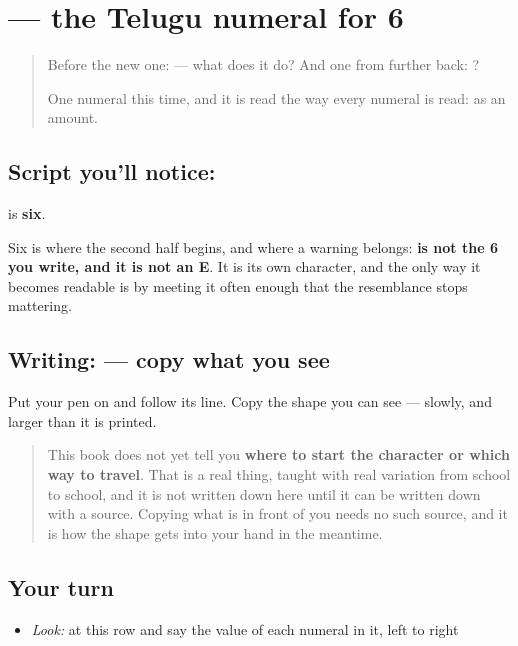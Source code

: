 \section[\texorpdfstring{\te{౬} (6)}{౬ (6)}]{ — the Telugu numeral for 6}

\label{lesson:TE-S145-digit-6}



\begin{quote}
Before the new one:  — what does it do? And one from further back: ?

One numeral this time, and it is read the way every numeral is read: as an amount.
\end{quote}

\subsection*{Script you'll notice: }
\textbf{} is \textbf{six}.

Six is where the second half begins, and where a warning belongs: \textbf{ is not the 6 you write, and it is not an E}. It is its own character, and the only way it becomes readable is by meeting it often enough that the resemblance stops mattering.

\subsection*{Writing:  — copy what you see}
Put your pen on  and follow its line. Copy the shape you can see — slowly, and larger than it is printed.

\begin{quote}
This book does not yet tell you \textbf{where to start the character or which way to travel}. That is a real thing, taught with real variation from school to school, and it is not written down here until it can be written down with a source. Copying what is in front of you needs no such source, and it is how the shape gets into your hand in the meantime.
\end{quote}

\subsection*{Your turn}
\begin{itemize}
\raggedright
  \item \emph{Look:} at this row and say the value of each numeral in it, left to right
\end{itemize}

